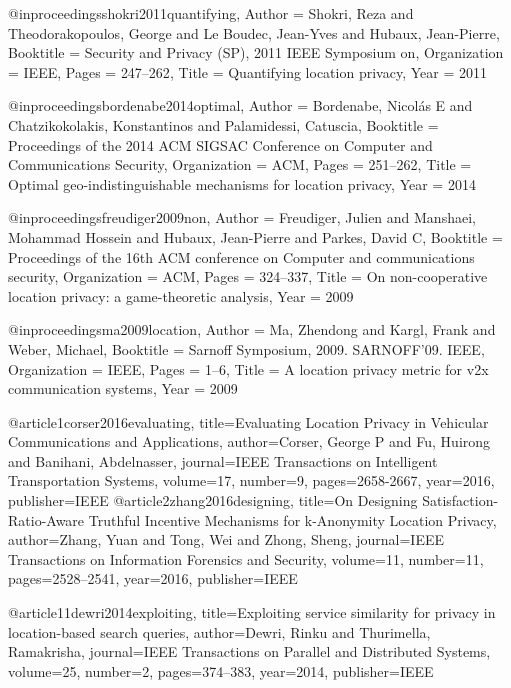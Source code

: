 @inproceedings{shokri2011quantifying,
	Author = {Shokri, Reza and Theodorakopoulos, George and Le Boudec, Jean-Yves and Hubaux, Jean-Pierre},
	Booktitle = {Security and Privacy (SP), 2011 IEEE Symposium on},
	Organization = {IEEE},
	Pages = {247--262},
	Title = {Quantifying location privacy},
	Year = {2011}}


@inproceedings{bordenabe2014optimal,
	Author = {Bordenabe, Nicol{\'a}s E and Chatzikokolakis, Konstantinos and Palamidessi, Catuscia},
	Booktitle = {Proceedings of the 2014 ACM SIGSAC Conference on Computer and Communications Security},
	Organization = {ACM},
	Pages = {251--262},
	Title = {Optimal geo-indistinguishable mechanisms for location privacy},
	Year = {2014}}




@inproceedings{freudiger2009non,
	Author = {Freudiger, Julien and Manshaei, Mohammad Hossein and Hubaux, Jean-Pierre and Parkes, David C},
	Booktitle = {Proceedings of the 16th ACM conference on Computer and communications security},
	Organization = {ACM},
	Pages = {324--337},
	Title = {On non-cooperative location privacy: a game-theoretic analysis},
	Year = {2009}}

@inproceedings{ma2009location,
	Author = {Ma, Zhendong and Kargl, Frank and Weber, Michael},
	Booktitle = {Sarnoff Symposium, 2009. SARNOFF'09. IEEE},
	Organization = {IEEE},
	Pages = {1--6},
	Title = {A location privacy metric for v2x communication systems},
	Year = {2009}}

@article{1corser2016evaluating,
  title={Evaluating Location Privacy in Vehicular Communications and Applications},
  author={Corser, George P and Fu, Huirong and Banihani, Abdelnasser},
  journal={IEEE Transactions on Intelligent Transportation Systems},
  volume={17},
  number={9},
  pages={2658-2667},
  year={2016},
  publisher={IEEE}
}
@article{2zhang2016designing,
  title={On Designing Satisfaction-Ratio-Aware Truthful Incentive Mechanisms for k-Anonymity Location Privacy},
  author={Zhang, Yuan and Tong, Wei and Zhong, Sheng},
  journal={IEEE Transactions on Information Forensics and Security},
  volume={11},
  number={11},
  pages={2528--2541},
  year={2016},
  publisher={IEEE}
}

@article{11dewri2014exploiting,
  title={Exploiting service similarity for privacy in location-based search queries},
  author={Dewri, Rinku and Thurimella, Ramakrisha},
  journal={IEEE Transactions on Parallel and Distributed Systems},
  volume={25},
  number={2},
  pages={374--383},
  year={2014},
  publisher={IEEE}
}

